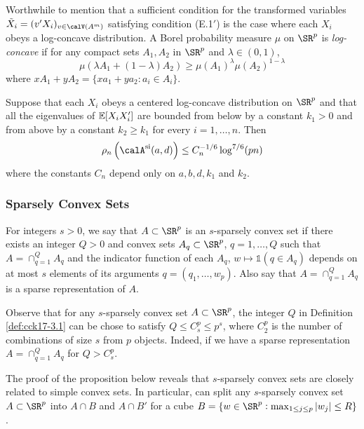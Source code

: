 Worthwhile to mention that a sufficient condition for the transformed variables $\tilde{X}_i = (v'X_i)_{v\in \calV(A^m)}$ satisfying condition (E.1$'$) is the case where each $X_i$ obeys a log-concave distribution. A Borel probability measure $\mu$ on $\SR^p$ is \emph{log-concave} if for any compact sets $A_1, A_2$ in $\SR^p$ and $\lambda \in (0,1)$, 
\[\mu(\lambda A_1 + (1-\lambda)A_2) \geq \mu(A_1)^\lambda \mu(A_2)^{1-\lambda}\]
where $xA_1 + yA_2 = \{xa_1 + ya_2: a_i \in A_i\}$. 
\begin{corollary}
	Suppose that each $X_i$ obeys a centered log-concave distribution on $\SR^p$ and that all the eigenvalues of $\mathbb{E}[X_i X_i']$ are bounded from below by a constant $k_1 > 0$ and from above by a constant $k_2 \geq k_1$ for every $i = 1, \dots, n$. Then 
	\[\rho_n\left(\calA^{\text{si}}(a,d)\right)\leq C_n^{-1/6} \log^{7/6}(pn)\]
	where the constants $C_n$ depend only on $a,b,d,k_1$ and $k_2$.
\end{corollary}

\subsubsection{Sparsely Convex Sets}
\begin{definition}
	\label{def:cck17-3.1}
	For integers $s > 0$, we say that $A \subset \SR^p$ is an $s$-sparsely convex set if there exists an integer $Q > 0$ and convex sets $A_q \subset \SR^p$, $q = 1, \dots, Q$ such that $A = \cap_{q=1}^Q A_q$ and the indicator function of each $A_q$, $w\mapsto \mathds{1}(q\in A_q)$ depends on at most $s$ elements of its arguments $q = (q_1, \dots, w_p)$. Also say that $A = \cap_{q = 1}^Q A_q$ is a sparse representation of $A$. 
\end{definition}

Observe that for any $s$-sparsely convex set $A\subset \SR^p$, the integer $Q$ in Definition \ref{def:cck17-3.1} can be chose to satisfy $Q \leq C_s^p \leq p^s$, where $C^p_2$ is the number of combinations of size $s$ from $p$ objects. Indeed, if we have a sparse representation $A = \cap_{q=1}^Q A_q$ for $Q > C_s^p$. 

The proof of the proposition below reveals that $s$-sparsely convex sets are closely related to simple convex sets. In particular, can split any $s$-sparsely convex set $A\subset \SR^p$ into $A \cap B$ and $A\cap B'$ for a cube $B = \{w\in \SR^p: \max_{1\leq j \leq p} |w_j| \leq R\}$.

